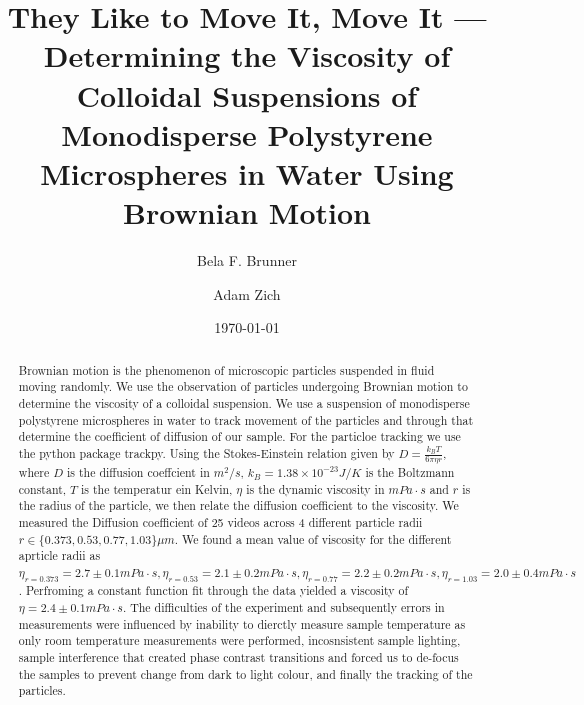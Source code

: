 \documentclass[twocolumn,a4paper,aps,amsmath,amssymb,floatfix,superscriptaddress]{revtex4-2}
\begin{document}
\title{They Like to Move It, Move It  — \\ Determining the Viscosity of Colloidal Suspensions of Monodisperse Polystyrene Microspheres in Water Using Brownian Motion}
        
\author{Bela F. Brunner}

\author{Adam Zich}

\date{\today}

\begin{abstract}
    Brownian motion is the phenomenon of microscopic particles suspended in fluid moving randomly. We use the observation of particles undergoing Brownian motion to determine the viscosity of a colloidal suspension. We use a suspension of monodisperse polystyrene microspheres in water to track movement of the particles and through that determine the coefficient of diffusion of our sample. For the particloe tracking we use the python package trackpy. Using the Stokes-Einstein relation given by $D = \frac{k_BT}{6\pi\eta r}$, where $D$ is the diffusion coeffcient in $m^2/s$, $k_B = 1.38 \times 10^{-23}J/K$ is the Boltzmann constant, $T$ is the temperatur ein Kelvin, $\eta$ is the dynamic viscosity in $mPa\cdot s$ and $r$ is the radius of the particle, we then relate the diffusion coefficient to the viscosity. We measured the Diffusion coefficient of 25 videos across 4 different particle radii $r \in \{0.373, 0.53, 0.77, 1.03\} \mu m$. We found a mean value of viscosity for the different aprticle radii as $\eta_{r = 0.373} = 2.7 \pm 0.1 mPa\cdot s, \eta_{r = 0.53} = 2.1 \pm 0.2 mPa\cdot s, \eta_{r = 0.77} = 2.2 \pm 0.2 mPa\cdot s, \eta_{r = 1.03} = 2.0 \pm 0.4 mPa\cdot s$. Perfroming a constant function fit through the data yielded a viscosity of $\eta = 2.4 \pm 0.1 mPa\cdot s$. The difficulties of the experiment and subsequently errors in measurements were influenced by inability to dierctly measure sample temperature as only room temperature measurements were performed, incosnsistent sample lighting, sample interference that created phase contrast transitions and forced us to de-focus the samples to prevent change from dark to light colour, and finally the tracking of the particles. 
\end{abstract}

\maketitle
\end{document}
